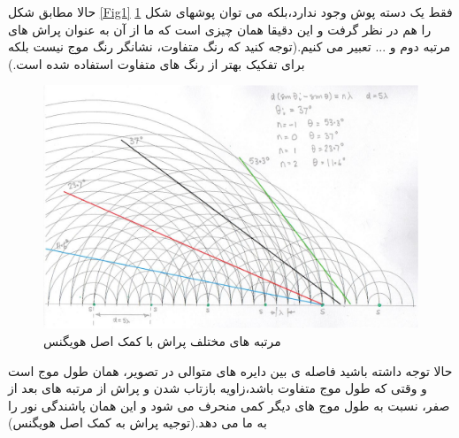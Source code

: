 \documentclass{article}
\begin{document}
حالا مطابق شکل
\ref{Fig1}
فقط یک دسته پوش وجود ندارد،‌بلکه می توان پوشهای شکل
\ref{Fig2}
را هم در نظر گرفت و این دقیقا همان چیزی است که ما از آن به عنوان پراش های مرتبه دوم و ... تعبیر می کنیم.(توجه کنید که رنگ متفاوت، نشانگر رنگ موج نیست بلکه برای تفکیک بهتر از رنگ های متفاوت استفاده شده است.)

\begin{figure}
	\centering
	\includegraphics[width=\linewidth]{2.jpg}
	\caption{مرتبه های مختلف پراش با کمک اصل هویگنس}
	\label{Fig2}
\end{figure}

\noindent
حالا توجه داشته باشید فاصله ی بین دایره های متوالی در تصویر، همان طول موج است و وقتی که طول موج متفاوت باشد،زاویه بازتاب شدن و پراش از مرتبه های بعد از صفر، نسبت به طول موج های دیگر کمی منحرف می شود و این همان پاشندگی نور را به ما می دهد.(توجیه پراش به کمک اصل هویگنس)
\end{document}
